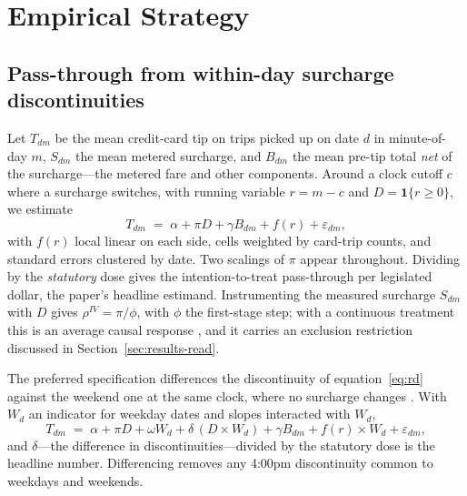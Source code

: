 \section{Empirical Strategy}
\label{sec:model}

\subsection{Pass-through from within-day surcharge discontinuities}
Let $T_{dm}$ be the mean credit-card tip on trips picked up on date $d$
in minute-of-day $m$, $S_{dm}$ the mean metered surcharge, and $B_{dm}$
the mean pre-tip total \emph{net} of the surcharge---the metered fare and
other components. Around a clock cutoff $c$ where a surcharge switches,
with running variable $r = m - c$ and $D = \mathbf{1}\{r \ge 0\}$, we
estimate
\begin{equation}\label{eq:rd}
  T_{dm} \;=\; \alpha + \pi D + \gamma B_{dm} + f(r) + \varepsilon_{dm},
\end{equation}
with $f(r)$ local linear on each side, cells weighted by card-trip
counts, and standard errors clustered by date. Two scalings of $\pi$
appear throughout. Dividing by the \emph{statutory} dose gives the
intention-to-treat pass-through per legislated dollar, the paper's
headline estimand. Instrumenting the measured surcharge $S_{dm}$ with
$D$ gives $\rho^{IV} = \pi/\phi$, with $\phi$ the first-stage step; with
a continuous treatment this is an average causal response
\parencite{angrist1995two}, and it carries an exclusion restriction
discussed in Section~\ref{sec:results-read}.

The preferred specification differences the discontinuity of
equation~\eqref{eq:rd} against the weekend one at the same clock, where
no surcharge changes \parencite{grembi2016difference}. With $W_d$ an
indicator for weekday dates and slopes interacted with $W_d$,
\begin{equation}\label{eq:didisc}
  T_{dm} \;=\; \alpha + \pi D + \omega W_d + \delta\,(D \times W_d)
    + \gamma B_{dm} + f(r) \times W_d + \varepsilon_{dm},
\end{equation}
and $\delta$---the difference in discontinuities---divided by the
statutory dose is the headline number. Differencing removes any 4:00pm
discontinuity common to weekdays and weekends.

